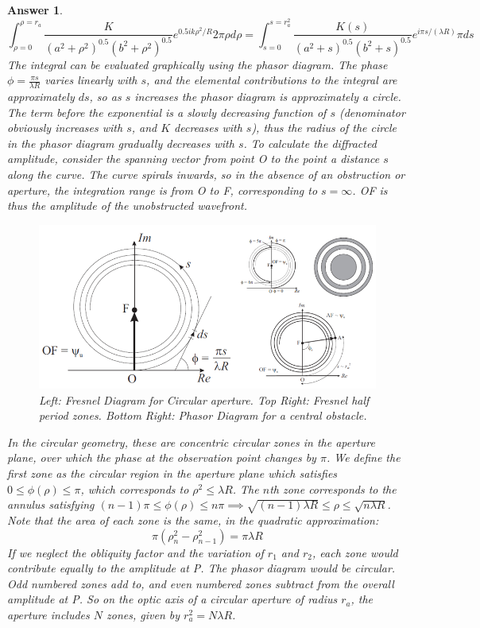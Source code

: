 \documentclass[a4paper]{article}
\newtheorem{ans}{Answer}[subsection]
\theoremstyle{new}
\begin{document}
\begin{ans}
$$\int_{\rho=0}^{\rho=r_a}\frac{K}{(a^2+\rho^2)^{0.5}(b^2+\rho^2)^{0.5}}e^{0.5ik\rho^2/R}2\pi\rho d\rho=\int_{s=0}^{s=r_a^2}\frac{K(s)}{(a^2+s)^{0.5}(b^2+s)^{0.5}}e^{i\pi s/(\lambda R)}\pi ds$$
The integral can be evaluated graphically using the phasor diagram. The phase $\phi=\frac{\pi s}{\lambda R}$ varies linearly with $s$, and the elemental contributions to the integral are approximately $ds$, so as $s$ increases the phasor diagram is approximately a circle. The term before the exponential is a slowly decreasing function of $s$ (denominator obviously increases with $s$, and $K$ decreases with $s$), thus the radius of the circle in the phasor diagram gradually decreases with $s$. To calculate the diffracted amplitude, consider the spanning vector from point O to the point a distance $s$ along the curve. The curve spirals inwards, so in the absence of an obstruction or aperture, the integration range is from O to F, corresponding to $s=\infty$. OF is thus the amplitude of the unobstructed wavefront.
\begin{figure}[H]
    \centering
    \includegraphics[width=\linewidth]{fresnelcircular.PNG}
    \caption{Left: Fresnel Diagram for Circular aperture. Top Right: Fresnel half period zones. Bottom Right: Phasor Diagram for a central obstacle.}
\end{figure}
In the circular geometry, these are concentric circular zones in the aperture plane, over which the phase at the observation point changes by $\pi$. We define the first zone as the circular region in the aperture plane which satisfies $0\leq\phi(\rho)\leq\pi$, which corresponds to $\rho^2\leq\lambda R$. The $n$th zone corresponds to the annulus satisfying $(n-1)\pi\leq\phi(\rho)\leq n\pi\implies\sqrt{(n-1)\lambda R}\leq\rho\leq\sqrt{n\lambda R}$. Note that the area of each zone is the same, in the quadratic approximation:
$$\pi(\rho_n^2-\rho_{n-1}^2)=\pi\lambda R$$
If we neglect the obliquity factor and the variation of $r_1$ and $r_2$, each zone would contribute equally to the amplitude at P. The phasor diagram would be circular. Odd numbered zones add to, and even numbered zones subtract from the overall amplitude at P. So on the optic axis of a circular aperture of radius $r_a$, the aperture includes $N$ zones, given by $r_a^2=N\lambda R$.\\[5pt]

\end{ans}
\end{document}
